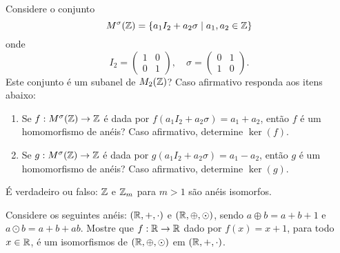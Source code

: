 \documentclass[12pt]{exam}
\begin{document}
    \vspace{.3cm}

    \questao{} Considere o conjunto
    \[
        M^\sigma(\mathbb{Z}) = \{a_1I_2 + a_2\sigma \mid a_1, a_2 \in \mathbb{Z}\}
    \]
    onde
    \[
        I_2 = \begin{pmatrix} 1 & 0\\ 0 & 1\end{pmatrix}, \quad \sigma = \begin{pmatrix} 0 & 1\\ 1 & 0\end{pmatrix}.
    \]
    Este conjunto é um subanel de $M_2(\mathbb{Z})$? Caso afirmativo responda aos itens abaixo:
    \begin{enumerate}[label=({\alph*})]
        \item Se $f : M^\sigma(\mathbb{Z}) \to \mathbb{Z}$ é dada por $f(a_1I_2 + a_2\sigma) = a_1 + a_2$, então $f$ é um homomorfismo de anéis? Caso afirmativo, determine $\ker(f)$.

        \item Se $g : M^\sigma(\mathbb{Z}) \to \mathbb{Z}$ é dada por $g(a_1I_2 + a_2\sigma) = a_1 - a_2$, então $g$ é um homomorfismo de anéis? Caso afirmativo, determine $\ker(g)$.
    \end{enumerate}

    \vspace{.3cm}

    \questao{} {É} verdadeiro ou falso: $\mathbb{Z}$ e $\mathbb{Z}_{m}$ para $m > 1$ são anéis
    isomorfos.

    \vspace{.3cm}

    \questao{} Considere os seguintes anéis: $(\mathbb{R}, +, \cdot)$ e $(\mathbb{R}, \oplus, \odot)$, sendo $a \oplus b = a + b + 1$ e $a \odot b = a + b + ab$. Mostre que $f : \mathbb{R} \to \mathbb{R}$ dado por $f(x) = x + 1$, para todo $x \in \mathbb{R}$, é um isomorfismos de $(\mathbb{R}, \oplus, \odot)$ em $(\mathbb{R}, +, \cdot)$.

    \vspace{.3cm}




\end{document}
